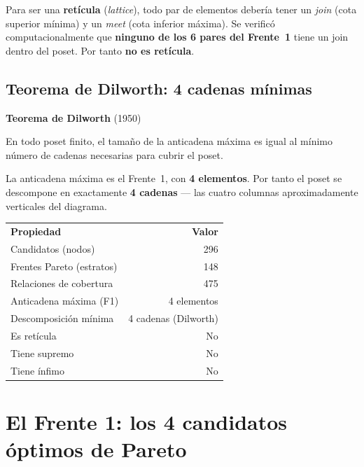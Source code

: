 \documentclass[11pt, a4paper]{article}
\newcommand{\TH}[1]{\cellcolor{cTHbg}\color{white}\textbf{#1}}
\begin{document}
Para ser una \textbf{ret\'icula} (\textit{lattice}), todo par de elementos
deber\'ia tener un \textit{join} (cota superior m\'inima) y un \textit{meet}
(cota inferior m\'axima). Se verific\'o computacionalmente que
\textbf{ninguno de los 6 pares del Frente~1} tiene un join dentro del poset.
Por tanto \textbf{no es ret\'icula}.

\subsection{Teorema de Dilworth: 4 cadenas m\'inimas}

\begin{tcolorbox}[theorembox]
  \textbf{Teorema de Dilworth} (1950)

  \smallskip
  En todo poset finito, el tama\~no de la anticadena m\'axima es igual al
  m\'inimo n\'umero de cadenas necesarias para cubrir el poset.
\end{tcolorbox}

La anticadena m\'axima es el Frente~1, con \textbf{4 elementos}. Por tanto
el poset se descompone en exactamente \textbf{4 cadenas} --- las cuatro
columnas aproximadamente verticales del diagrama.

\medskip
\begin{center}
\begin{tabular}{lr}
  \TH{Propiedad} & \TH{Valor} \\[1pt]
  Candidatos (nodos)            & 296 \\
  Frentes Pareto (estratos)     & 148 \\
  Relaciones de cobertura       & 475 \\
  Anticadena m\'axima (F1)      & 4 elementos \\
  Descomposici\'on m\'inima     & 4 cadenas (Dilworth) \\
  Es ret\'icula                 & No \\
  Tiene supremo                 & No \\
  Tiene \'infimo                & No \\
\end{tabular}
\end{center}

\section{El Frente 1: los 4 candidatos \'optimos de Pareto}
\end{document}
